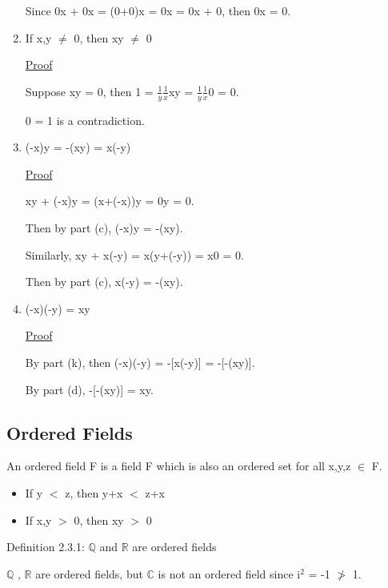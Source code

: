 \begin{enumerate}[label=(\alph*), leftmargin=2cm, itemsep=0.1cm]
				Since 0x + 0x = (0+0)x = 0x = 0x + 0, then 0x = 0.
	
		\item If x,y $\not =$ 0, then xy $\not =$ 0

			{ \color{magenta} \underline{Proof} } 
		
				Suppose xy = 0, then 1 = $\frac{1}{y}\frac{1}{x}$xy
				= $\frac{1}{y}$$\frac{1}{x}$0 = 0. 

				0 = 1 is a contradiction.
	
		\item (-x)y = -(xy) = x(-y)

			{ \color{magenta} \underline{Proof} } 
		
				xy + (-x)y = (x+(-x))y = 0y = 0.

				Then by part (c), (-x)y = -(xy).

				Similarly, xy + x(-y) = x(y+(-y)) = x0 = 0.
	
				Then by part (c), x(-y) = -(xy).

		\item (-x)(-y) = xy

			{ \color{magenta} \underline{Proof} } 
		
				By part (k), then (-x)(-y) = -[x(-y)] = -[-(xy)].

				By part (d), -[-(xy)] = xy.
	\end{enumerate}





\subsection{Ordered Fields}

	\qquad An ordered field F is a field F which is also an ordered set for all x,y,z $\in$ F.

	\begin{itemize}[leftmargin=2cm, itemsep=0.1cm]
		\item If y $<$ z, then y+x $<$ z+x
	
		\item If x,y $>$ 0, then xy $>$ 0
	\end{itemize}

\newpage

{ \color{blue} Definition 2.3.1: $ \mathbb{Q} $ and $ \mathbb{R} $ are ordered fields } 

	\qquad $ \mathbb{Q} $ , $ \mathbb{R} $ are ordered fields,
	but $ \mathbb{C} $ is not an ordered field since i$^2$ = -1 $\not >$ 1. \\

